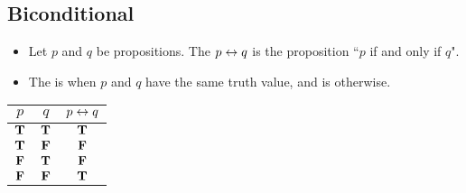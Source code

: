   \subsection{Biconditional}
      \begin{itemize}
        \item Let $p$ and $q$ be propositions. The 
        $p \leftrightarrow q$ is the proposition ``$p$ if and only if $q$".
        \item The  is  when $p$ and $q$ have the same
        truth value, and is  otherwise.
      \end{itemize}

    \begin{center}
      \begin{tabular}{|c|c|c|}
        \hline
        $p$ & $q$ & $p \leftrightarrow q$ \\
        \hline
        $\mathbf{T}$ & $\mathbf{T}$ & $\mathbf{T}$ \\
        \hline
        $\mathbf{T}$ & $\mathbf{F}$ & $\mathbf{F}$ \\
        \hline
        $\mathbf{F}$ & $\mathbf{T}$ & $\mathbf{F}$ \\
        \hline
        $\mathbf{F}$ & $\mathbf{F}$ & $\mathbf{T}$ \\
        \hline
      \end{tabular}
    \end{center}

